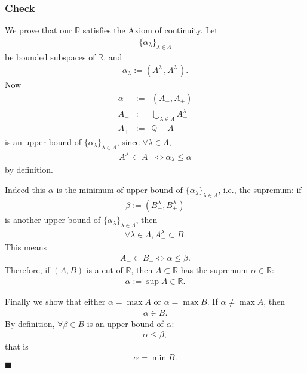 \documentclass[11pt]{book}
\begin{document}
\subsubsection{Check}
We prove that our $\mathbb{R}$ satisfies the Axiom of continuity.
Let 
\begin{eqnarray}
\{\alpha_\lambda\}_{\lambda \in \Lambda}
\end{eqnarray}
be bounded subspaces of $\mathbb{R}$, and
\begin{eqnarray}
\alpha_\lambda := (A^\lambda_-, A^\lambda_+).
\end{eqnarray}
Now
\begin{eqnarray}
\alpha &:=& (A_-, A_+) \\
A_- &:=& \bigcup_{\lambda \in \Lambda} A^\lambda_- \\
A_+ &:=& \mathbb{Q} - A_-
\end{eqnarray}
is an upper bound of $\{\alpha_\lambda\}_{\lambda \in \Lambda}$, since $\forall \lambda \in \Lambda$,
\begin{eqnarray}
A^\lambda_- \subset A_- \Leftrightarrow \alpha_\lambda \leq \alpha
\end{eqnarray}
by definition.

Indeed this $\alpha$ is the minimum of upper bound of $\{\alpha_\lambda\}_{\lambda \in \Lambda}$, i.e., the supremum: if 
\begin{eqnarray}
\beta := (B^\lambda_-, B^\lambda_+)
\end{eqnarray}
is another upper bound of $\{\alpha_\lambda\}_{\lambda \in \Lambda}$, then 
\begin{eqnarray}
\forall \lambda \in \Lambda, A^\lambda_- \subset B.
\end{eqnarray}
This means
\begin{eqnarray}
A_- \subset B_- \Leftrightarrow \alpha \leq \beta.
\end{eqnarray}
Therefore, if $(A,B)$ is a cut of $\mathbb{R}$, then $A \subset \mathbb{R}$ has the supremum $\alpha \in \mathbb{R}$:
\begin{eqnarray}
\alpha := \sup A \in \mathbb{R}.
\end{eqnarray}

Finally we show that either $\alpha = \max A$ or $\alpha = \max B$.
If $\alpha \neq \max A$, then
\begin{eqnarray}
\alpha \in B.
\end{eqnarray}
By definition, $\forall \beta \in B$ is an upper bound of $\alpha$:
\begin{eqnarray}
\alpha \leq \beta,
\end{eqnarray}
that is
\begin{eqnarray}
\alpha = \min B.
\end{eqnarray}
$\blacksquare$
\end{document}
